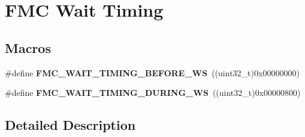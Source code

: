 \hypertarget{group___f_m_c___wait___timing}{}\section{F\+MC Wait Timing}
\label{group___f_m_c___wait___timing}
\subsection*{Macros}
\begin{DoxyCompactItemize}
\item 
\#define {\bfseries F\+M\+C\+\_\+\+W\+A\+I\+T\+\_\+\+T\+I\+M\+I\+N\+G\+\_\+\+B\+E\+F\+O\+R\+E\+\_\+\+WS}~((uint32\+\_\+t)0x00000000)\hypertarget{group___f_m_c___wait___timing_ga80ca167409942de2aff833b8c6675a14}{}\label{group___f_m_c___wait___timing_ga80ca167409942de2aff833b8c6675a14}

\item 
\#define {\bfseries F\+M\+C\+\_\+\+W\+A\+I\+T\+\_\+\+T\+I\+M\+I\+N\+G\+\_\+\+D\+U\+R\+I\+N\+G\+\_\+\+WS}~((uint32\+\_\+t)0x00000800)\hypertarget{group___f_m_c___wait___timing_ga28a9487a32e1fa577ccc30af040807a1}{}\label{group___f_m_c___wait___timing_ga28a9487a32e1fa577ccc30af040807a1}

\end{DoxyCompactItemize}


\subsection{Detailed Description}
